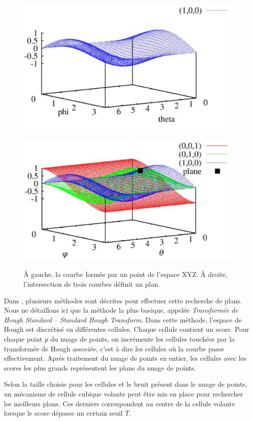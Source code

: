 ﻿\documentclass[12pt, twoside]{article}
\begin{document}
\begin{figure}[h]
\centering
\includegraphics[scale=0.5]{HoughCurv1.png}~\includegraphics[scale=0.5]{HoughCurv0.png}
\caption{\label{fig:Hough2} À gauche, la courbe formée par un point de l’espace XYZ. À droite, l’intersection de trois courbes définit un plan.}
\end{figure}

Dans \cite{Hough1}, plusieurs méthodes sont décrites pour effectuer cette recherche de plans. Nous ne détaillons ici que la méthode la plus basique, appelée \textit{Transformée de Hough Standard} -- \textit{Standard Hough Transform}. Dans cette méthode, l'espace de Hough est discrétisé en différentes cellules. Chaque cellule contient un score. Pour chaque point $p$ du nuage de points, on incrémente les cellules touchées par la transformée de Hough associée, c'est à dire les cellules où la courbe passe effectivement. Après traitement du nuage de points en entier, les cellules avec les scores les plus grands représentent les plans du nuage de points.

Selon la taille choisie pour les cellules et le bruit présent dans le nuage de points, un mécanisme de cellule cubique volante peut être mis en place pour rechercher les meilleurs plans. Ces derniers correspondent au centre de la cellule volante lorsque le score dépasse un certain seuil $T$.
\end{document}
